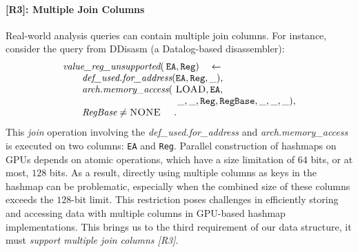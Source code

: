 \documentclass[nonacm,sigplan]{acmart}
\begin{document}
\paragraph*{[R3]: Multiple Join Columns} 
Real-world analysis queries can contain multiple join columns. For instance, consider the query from DDisasm \cite{flores2020ddisasm} (a Datalog-based disassembler):
\[
\begin{array}{ll}
\textit{value\_reg\_unsupported} ( & \! \! \! \! \! \! \! \! \! \! \! \!  \texttt{EA},\texttt{Reg}) \quad  \leftarrow  \\
\qquad \textit{def\_used.for\_address} ( & \! \! \! \! \! \! \texttt{EA},\texttt{Reg},\_), \\
\qquad \textit{arch.memory\_access} ( & \! \! \! \! \! \!  \textsc{LOAD},\texttt{EA}, \\
   & \! \! \! \! \! \_,\_,\texttt{Reg},\texttt{RegBase},\_,\_,\_), \\
\qquad \textit{RegBase} \neq \textsc{NONE} & \! \! \! \! \! \! \!.
\end{array}
\]
This \emph{join} operation involving the  \textit{def\_used.for\_address}
and \textit{arch.memory\_access} is executed on two columns: \texttt{EA} and \texttt{Reg}. Parallel construction of hashmaps on GPUs depends on atomic operations, which have a size limitation of $64$ bits, or at most, $128$ bits. As a result, directly using multiple columns as keys in the hashmap can be problematic, especially when the combined size of these columns exceeds the $128$-bit limit. This restriction poses challenges in efficiently storing and accessing data with multiple columns in GPU-based hashmap implementations. This brings us to the third requirement of our data structure, it must \emph{support multiple join columns [R3]}.




\end{document}

